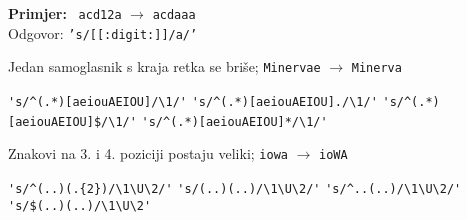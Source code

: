 \documentclass[a4paper,11pt]{exam}
\newcommand{\shell}[1]{\texttt{#1}}
\begin{document}
\begin{questions}
{	\textbf{Primjer:} \, \shell{acd12a} $\longrightarrow$ \shell{acdaaa}\\
	Odgovor: \shell{'s/[[:digit:]]/a/'}
}

	\question Jedan samoglasnik s kraja retka se briše; \shell{Minervae} $\longrightarrow$ \shell{Minerva}
	
	\begin{choices}
		\choice \verb|'s/^(.*)[aeiouAEIOU]/\1/'|
		\choice \verb|'s/^(.*)[aeiouAEIOU]./\1/'|
		\CorrectChoice \verb|'s/^(.*)[aeiouAEIOU]$/\1/'|
		\choice \verb|'s/^(.*)[aeiouAEIOU]*/\1/'| 
	\end{choices}
	
	\question Znakovi na 3. i 4. poziciji postaju veliki; \shell{iowa} $\longrightarrow$ \shell{ioWA}

	\begin{choices}
		\CorrectChoice \verb|'s/^(..)(.{2})/\1\U\2/'|
		\choice \verb|'s/(..)(..)/\1\U\2/'|
		\choice \verb|'s/^..(..)/\1\U\2/'|
		\choice \verb|'s/$(..)(..)/\1\U\2'|
	\end{choices}
\end{questions}
\end{document}
